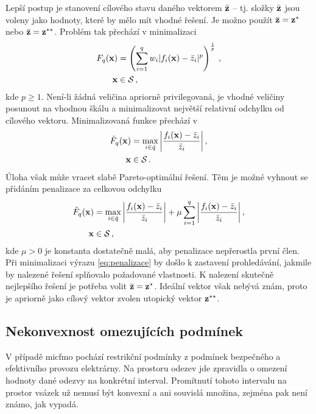Lepší postup je stanovení cílového stavu daného vektorem $\bar{\mathbf{z}}$ -- tj. složky $\bar{\mathbf{z}}$ jsou voleny jako hodnoty, které by mělo mít vhodné 
řešení. Je možno použít $\bar{\mathbf{z}} = \mathbf{z}^{\ast}$ nebo $\bar{\mathbf{z}} = \mathbf{z}^{\ast\ast}$. Problém tak 
přechází v minimalizaci
\begin{align}
	F_q (\mathbf{x}) &= \left(\sum_{i=1}^q w_i|f_i (\mathbf{x}) - \bar{z}_i|^p \right)^{\frac{1}{p}}\,,\\
	\mathbf{x}&\in\mathcal{S}\,,
\end{align}
kde $p\geq1$. Není-li žádná veličina apriorně privilegovaná, je vhodné veličiny posunout na vhodnou škálu a minimalizovat největší relativní 
odchylku od cílového vektoru. Minimalizovaná funkce přechází v
\begin{align}
	\tilde{F}_q (\mathbf{x}) &= \operatorname*{max}\limits_{i\in\hat{q}} \bigg|\frac{f_i (\mathbf{x}) - \bar{z}_i}{\bar{z}_i}\bigg| \,,\\
	\mathbf{x}&\in\mathcal{S}\,.
\end{align}
Úloha však může vracet slabě Pareto-optimální řešení. Těm je možné vyhnout se přidáním penalizace za celkovou odchylku
\begin{align}
	\tilde{F}_q (\mathbf{x}) &= \operatorname*{max}\limits_{i\in\hat{q}} \bigg|\frac{f_i (\mathbf{x}) - \bar{z}_i}{\bar{z}_i}\bigg| + \mu\sum_{i=1}^q \bigg|\frac{f_i (\mathbf{x}) - \bar{z}_i}{\bar{z}_i}\bigg|\,,\label{eq:penalizace}\\
	\mathbf{x}&\in\mathcal{S}\,,
\end{align}
kde $\mu>0$ je konstanta dostatečně malá, aby penalizace nepřerostla první člen. Při minimalizaci výrazu \eqref{eq:penalizace} by došlo k zastavení 
prohledávání, jakmile by nalezené řešení splňovalo požadované vlastnosti. K nalezení skutečně nejlepšího řešení je potřeba 
volit $\bar{\mathbf{z}} = \mathbf{z}^{\ast}$. Ideální vektor však nebývá znám, proto je apriorně jako cílový vektor zvolen utopický 
vektor $\mathbf{z}^{\ast\ast}$. 



\subsection{Nekonvexnost omezujících podmínek}
V případě \ac{micfmo} pochází restrikční podmínky z podmínek bezpečného a efektivního provozu elektrárny. 
Na prostoru odezev jde zpravidla o omezení hodnoty dané odezvy na konkrétní interval. Promítnutí tohoto intervalu na prostor vsázek už nemusí 
být konvexní a ani souvislá množina, zejména pak není známo, jak vypadá.

